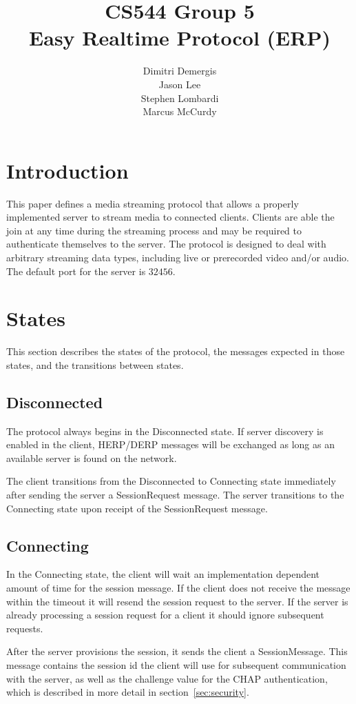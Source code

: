 \documentclass[12pt,letterpaper,titlepage]{article}
\author{Dimitri Demergis \\ Jason Lee \\ Stephen Lombardi \\ Marcus McCurdy}
\title{CS544 Group 5 \\ Easy Realtime Protocol (ERP)}
\begin{document}
\maketitle

\tableofcontents

\pagebreak

\section{Introduction}
This paper defines a media streaming protocol that allows a properly implemented server to stream media to connected clients. Clients are able the join at any time during the streaming process and may be required to authenticate themselves to the server. The protocol is designed to deal with arbitrary streaming data types, including live or prerecorded video and/or audio. The default port for the server is $32456$.


\section{States}
This section describes the states of the protocol, the messages expected in those states, and the
transitions between states.

\subsection{Disconnected}
The protocol always begins in the Disconnected state.  If server discovery is enabled in the client, 
HERP/DERP messages will be exchanged as long as an available server is found on the network.

The client transitions from the Disconnected to Connecting state immediately after sending the 
server a SessionRequest message.  The server transitions to the Connecting state upon receipt 
of the SessionRequest message.

\subsection{Connecting}
In the Connecting state, the client will wait an implementation dependent amount of time for the 
session message. If the client does not receive the message within the timeout it will resend
the session request to the server.  If the server is already processing a session request for a client
it should ignore subsequent requests.

After the server provisions the session, it sends the client a SessionMessage. This message 
contains the session id the client will use for subsequent communication with the server, as
well as the challenge value for the CHAP authentication, which is described in more detail
in section~\ref{sec:security}.
\end{document}
